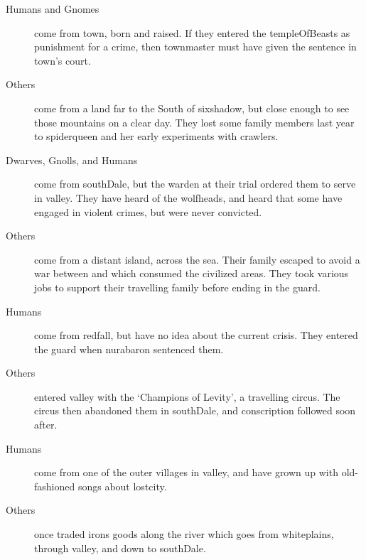 \begin{multicols}{2}
\begin{dlist}
  \item
  \begin{description}
    \item[Humans and Gnomes]
  come from \gls{town}, born and raised.
  If they entered the \gls{templeOfBeasts} as punishment for a crime, then \gls{townmaster} must have given the sentence in \gls{town}'s \gls{court}.
    \item[Others]
    come from a land far to the South of \gls{sixshadow}, but close enough to see those mountains on a clear day.
    They lost some family members last year to \gls{spiderqueen} and her early experiments with \glspl{crawler}.
  \end{description}
  \item
  \begin{description}
    \item[Dwarves, Gnolls, and Humans]
    come from \gls{southDale}, but the \gls{warden} at their trial ordered them to serve in \gls{valley}.
    They have heard of the \glspl{wolfhead}, and heard that some have engaged in violent crimes, but were never convicted.
    \item[Others]
    come from a distant island, across the sea.
    Their family escaped to avoid a war between  and  which consumed the civilized areas.
    They took various jobs to support their travelling family before ending in the \gls{guard}.
  \end{description}
  \item
  \begin{description}
    \item[Humans]
    come from \gls{redfall}, but have no idea about the current crisis.
    They entered the \gls{guard} when \gls{nurabaron} sentenced them.
    \item[Others]
    entered \gls{valley} with the `Champions of Levity', a travelling circus.
    The circus then abandoned them in \gls{southDale}, and conscription followed soon after.
  \end{description}
  \item
  \begin{description}
    \item[Humans]
    come from one of the outer \glspl{village} in \gls{valley}, and have grown up with old-fashioned songs about \gls{lostcity}.
    \item[Others]
    once traded irons goods along the river which goes from \gls{whiteplains}, through \gls{valley}, and down to \gls{southDale}.

\end{description}
\end{dlist}
\end{multicols}
